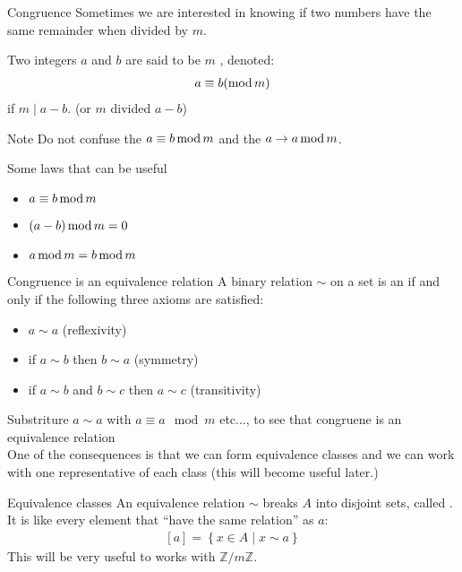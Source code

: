     \begin{parag}{Congruence}
        Sometimes we are interested in knowing if two numbers have the same remainder when divided by $m$.
        \begin{definition}
            Two integers $a$ and $b$ are said to be  $m$ , denoted:
            \begin{align*} a \equiv b \left(\Mod m\right) \end{align*}
            if $m \mid a - b$.
            (or $m$ divided $a - b$)
        \end{definition}
        \begin{subparag}{Note}
            Do not confuse the  $a \equiv b \operatorname{mod} m$ and the   $a \to a \operatorname{mod} m$.
        \end{subparag}
    \end{parag}
    \begin{parag}{Some laws that can be useful}
        \begin{itemize}
            \item $a \equiv b \operatorname{mod} m$
            \item $\left(a-b\right) \Mod m = 0$
            \item $a \operatorname{mod} m =  b \operatorname{mod} m$
        \end{itemize}
    \end{parag}
    
    
    \begin{parag}{Congruence is an equivalence relation}
        A binary relation $ \sim$ on a set is an  if and only if the following three axioms are satisfied:
        \begin{itemize}
            \item $a \sim a$ (reflexivity)
            \item if $ a \sim b$ then $ b \sim a$ (symmetry)
            \item if $ a \sim b$ and $b \sim c$ then $ a \sim c$ (transitivity)
        \end{itemize}
        Substriture $a \sim a$ with $ a \equiv a \mod m$ etc...,  to see that congruene is an equivalence relation\\
        One of the consequences is that we can form equivalence classes and we can work with one representative of each class (this will become useful later.)
    
    \end{parag}
    \begin{parag}{Equivalence classes}
        An equivalence relation $\sim$ breaks $A$ into disjoint sets, called . \\
        It is like every element that ``have the same relation'' as $a$:
        \begin{align*} \left[a\right] = \left\{x \in A \mid x \sim a\right\} \end{align*}
        This will be very useful to works with $ \mathbb{Z} / m \mathbb{Z}$.
    \end{parag}
    

